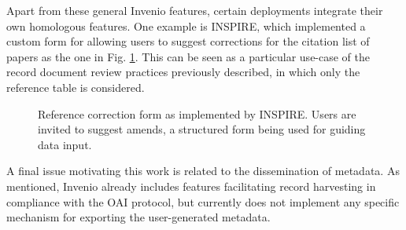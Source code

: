 Apart from these general Invenio features, certain deployments integrate their
own homologous features. One example is INSPIRE, which implemented a custom
form for allowing users to suggest corrections for the citation list of papers
as the one in Fig. \ref{fig:inspire}. This can be seen as a particular use-case
of the record document review practices previously described, in which only the
reference table is considered.

\begin{figure}[!ht]
  \centering
  \caption[Reference correction form as implemented by INSPIRE.]
          {Reference correction form as implemented by INSPIRE. Users are
           invited to suggest amends, a structured form being used for guiding
           data input.}
  \label{fig:inspire}
\end{figure}

A final issue motivating this work is related to the dissemination of metadata.
As mentioned, Invenio already includes features facilitating record harvesting
in compliance with the OAI protocol, but currently does not implement any
specific mechanism for exporting the user-generated metadata.

